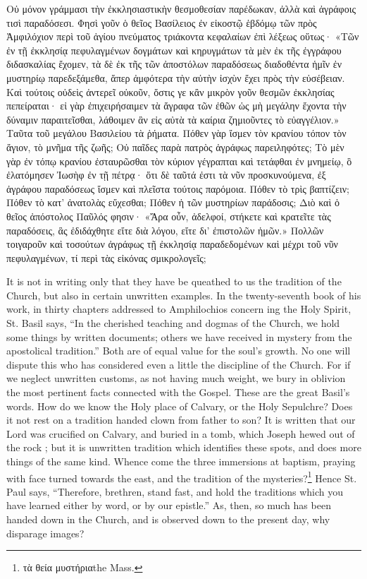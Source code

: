 \documentclass[10pt]{book}
\newcommand{\switchgreek}[1][]{\selectlanguage{polutonikogreek} \switchcolumn*[#1]}
\newcommand{\switchenglish}{\selectlanguage{english} \switchcolumn}
\begin{document}
\begin{paracol}{2}
\switchgreek

Οὐ μόνον γράμμασι τὴν ἐκκλησιαστικὴν θεσμοθεσίαν παρέδωκαν, ἀλλὰ καὶ ἀγράφοις τισὶ παραδόσεσι.
Φησὶ γοῦν ὁ θεῖος Βασίλειος ἐν εἰκοστῷ ἑβδόμῳ τῶν πρὸς Ἀμφιλόχιον περὶ τοῦ ἁγίου πνεύματος τριάκοντα κεφαλαίων ἐπὶ λέξεως οὕτως· «Τῶν ἐν τῇ ἐκκλησίᾳ πεφυλαγμένων δογμάτων καὶ κηρυγμάτων τὰ μὲν ἐκ τῆς ἐγγράφου διδασκαλίας ἔχομεν, τὰ δὲ ἐκ τῆς τῶν ἀποστόλων παραδόσεως διαδοθέντα ἡμῖν ἐν μυστηρίῳ παρεδεξάμεθα, ἅπερ ἀμφότερα τὴν αὐτὴν ἰσχὺν ἔχει πρὸς τὴν εὐσέβειαν.
Καὶ τούτοις οὐδεὶς ἀντερεῖ οὐκοῦν, ὅστις γε κἂν μικρὸν γοῦν θεσμῶν ἐκκλησίας πεπείραται· εἰ γὰρ ἐπιχειρήσαιμεν τὰ ἄγραφα τῶν ἐθῶν ὡς μὴ μεγάλην ἔχοντα τὴν δύναμιν παραιτεῖσθαι, λάθοιμεν ἂν εἰς αὐτὰ τὰ καίρια ζημιοῦντες τὸ εὐαγγέλιον.» Ταῦτα τοῦ μεγάλου Βασιλείου τὰ ῥήματα.
Πόθεν γὰρ ἴσμεν τὸν κρανίου τόπον τὸν ἅγιον, τὸ μνῆμα τῆς ζωῆς; Οὐ παῖδες παρὰ πατρὸς ἀγράφως παρειληφότες; Τὸ μὲν γὰρ ἐν τόπῳ κρανίου ἐσταυρῶσθαι τὸν κύριον γέγραπται καὶ τετάφθαι ἐν μνημείῳ, ὃ ἐλατόμησεν Ἰωσὴφ ἐν τῇ πέτρᾳ· ὅτι δὲ ταῦτά ἐστι τὰ νῦν προσκυνούμενα, ἐξ ἀγράφου παραδόσεως ἴσμεν καὶ πλεῖστα τούτοις παρόμοια.
Πόθεν τὸ τρὶς βαπτίζειν; Πόθεν τὸ κατ’ ἀνατολὰς εὔχεσθαι; Πόθεν ἡ τῶν μυστηρίων παράδοσις; Διὸ καὶ ὁ θεῖος ἀπόστολος Παῦλός φησιν· «Ἄρα οὖν, ἀδελφοί, στήκετε καὶ κρατεῖτε τὰς παραδόσεις, ἃς ἐδιδάχθητε εἴτε διὰ λόγου, εἴτε δι’ ἐπιστολῶν ἡμῶν.» Πολλῶν τοιγαροῦν καὶ τοσούτων ἀγράφως τῇ ἐκκλησίᾳ παραδεδομένων καὶ μέχρι τοῦ νῦν πεφυλαγμένων, τί περὶ τὰς εἰκόνας σμικρολογεῖς;

\switchenglish

It is not in writing only that they have be 
queathed to us the tradition of the Church, but 
also in certain unwritten examples. In the 
twenty-seventh book of his work, in thirty 
chapters addressed to Amphilochios concern 
ing the Holy Spirit, St. Basil says, ``In the 
cherished teaching and dogmas of the Church, 
we hold some things by written documents; 
others we have received in mystery from the 
apostolical tradition.'' Both are of equal value 
for the soul's growth. No one will dispute 
this who has considered even a little the discipline of the Church. For if we neglect unwritten customs, as not having much weight, 
we bury in oblivion the most pertinent facts 
connected with the Gospel. These are the 
great Basil's words. How do we know the 
Holy place of Calvary, or the Holy Sepulchre? 
Does it not rest on a tradition handed clown 
from father to son? It is written that our 
Lord was crucified on Calvary, and buried in 
a tomb, which Joseph hewed out of the rock ; 
but it is unwritten tradition which identifies 
these spots, and does more things of the same 
kind. Whence come the three immersions 
at baptism, praying with face turned towards 
the east, and the tradition of the mysteries?\footnote{τὰ θεία μυστήρια\textemdash the Mass.}
Hence St. Paul says, ``Therefore, brethren, stand 
fast, and hold the traditions which you have 
learned either by word, or by our epistle.'' As, 
then, so much has been handed down in the 
Church, and is observed down to the present 
day, why disparage images? 


\end{paracol}
\end{document}
